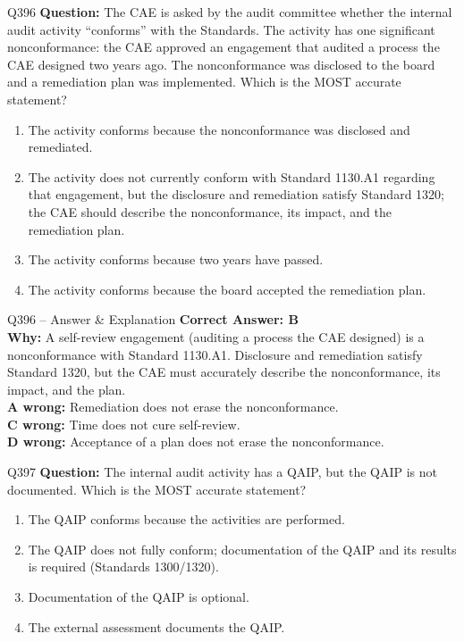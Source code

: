 \documentclass[aspectratio=169,10pt]{beamer}
\begin{document}
	\begin{frame}[t]{Q396}
		\small
		\textbf{Question:} The CAE is asked by the audit committee whether the internal audit activity ``conforms'' with the Standards. The activity has one significant nonconformance: the CAE approved an engagement that audited a process the CAE designed two years ago. The nonconformance was disclosed to the board and a remediation plan was implemented. Which is the MOST accurate statement?
		\begin{enumerate}[label=\Alph*.,itemsep=1pt,topsep=2pt]
			\item The activity conforms because the nonconformance was disclosed and remediated.
			\item The activity does not currently conform with Standard 1130.A1 regarding that engagement, but the disclosure and remediation satisfy Standard 1320; the CAE should describe the nonconformance, its impact, and the remediation plan.
			\item The activity conforms because two years have passed.
			\item The activity conforms because the board accepted the remediation plan.
		\end{enumerate}
	\end{frame}
	
	\begin{frame}[t]{Q396 -- Answer \& Explanation}
		\small
		\textbf{Correct Answer: B} \\[4pt]
		\textbf{Why:} A self-review engagement (auditing a process the CAE designed) is a nonconformance with Standard 1130.A1. Disclosure and remediation satisfy Standard 1320, but the CAE must accurately describe the nonconformance, its impact, and the plan. \\[4pt]
		\textbf{A wrong:} Remediation does not erase the nonconformance. \\[2pt]
		\textbf{C wrong:} Time does not cure self-review. \\[2pt]
		\textbf{D wrong:} Acceptance of a plan does not erase the nonconformance.
	\end{frame}
	
	\begin{frame}[t]{Q397}
		\small
		\textbf{Question:} The internal audit activity has a QAIP, but the QAIP is not documented. Which is the MOST accurate statement?
		\begin{enumerate}[label=\Alph*.,itemsep=1pt,topsep=2pt]
			\item The QAIP conforms because the activities are performed.
			\item The QAIP does not fully conform; documentation of the QAIP and its results is required (Standards 1300/1320).
			\item Documentation of the QAIP is optional.
			\item The external assessment documents the QAIP.
		\end{enumerate}
	\end{frame}
	
\end{document}
